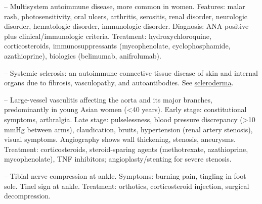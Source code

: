 -- Multisystem autoimmune disease, more common in women. Features: malar rash, photosensitivity, oral ulcers, arthritis, serositis, renal disorder, neurologic disorder, hematologic disorder, immunologic disorder. Diagnosis: ANA positive plus clinical/immunologic criteria. Treatment: hydroxychloroquine, corticosteroids, immunosuppressants (mycophenolate, cyclophosphamide, azathioprine), biologics (belimumab, anifrolumab).


-- Systemic sclerosis: an autoimmune connective tissue disease of skin and internal organs due to fibrosis, vasculopathy, and autoantibodies. See \hyperlink{Scleroderma}{scleroderma}.

-- Large-vessel vasculitis affecting the aorta and its major branches, predominantly in young Asian women (<40 years). Early stage: constitutional symptoms, arthralgia. Late stage: pulselessness, blood pressure discrepancy (>10 mmHg between arms), claudication, bruits, hypertension (renal artery stenosis), visual symptoms. Angiography shows wall thickening, stenosis, aneurysms. Treatment: corticosteroids, steroid-sparing agents (methotrexate, azathioprine, mycophenolate), TNF inhibitors; angioplasty/stenting for severe stenosis.

-- Tibial nerve compression at ankle. Symptoms: burning pain, tingling in foot sole. Tinel sign at ankle. Treatment: orthotics, corticosteroid injection, surgical decompression.

